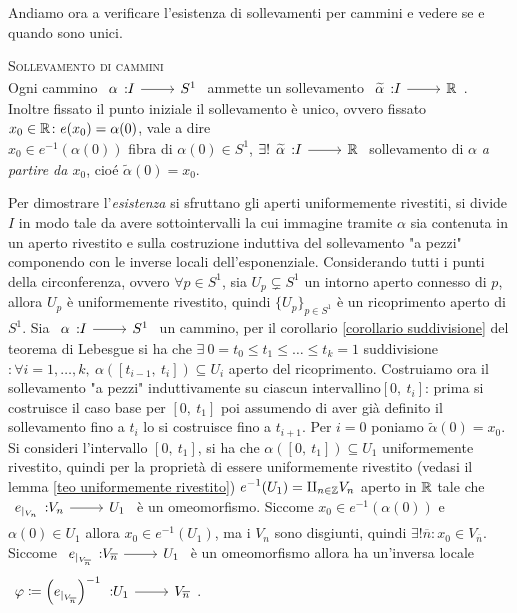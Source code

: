 Andiamo ora a verificare l'esistenza di sollevamenti per cammini e vedere se e quando sono unici.
\begin{theorema} \textsc{Sollevamento di cammini} \label{teo sollevamento cammini}\\
	Ogni cammino $\funz \alpha I {S^1}$ ammette un sollevamento $\funz {\widetilde{\alpha}} I \realset$. Inoltre fissato il punto iniziale il sollevamento è unico, ovvero fissato $x_0\in\mathbb{R} \colon e(x_0)=\alpha(0)$, vale a dire \\
	$x_0\in e^{-1}(\alpha(0))$ fibra di $\alpha(0)\in S^1$,  $\exists ! \funz {\widetilde{\alpha}} I \realset$ sollevamento di $\alpha$ \textit{a partire da $x_0$}, cioé $\widetilde{\alpha}(0)=x_0$.
\end{theorema}
\begin{demonstration}
	Per dimostrare l'\textit{esistenza} si sfruttano gli aperti uniformemente rivestiti, si divide $I$ in modo tale da avere sottointervalli la cui immagine tramite $\alpha$ sia contenuta in un aperto rivestito e sulla costruzione induttiva del sollevamento "a pezzi" componendo con le inverse locali dell'esponenziale.\newline
	Considerando tutti i punti della circonferenza, ovvero $\forall p\in S^1$, sia $U_p\subsetneq S^1$ un intorno aperto connesso di $p$, allora $U_p$ è uniformemente rivestito, quindi $\{U_p\}_{p\in S^1}$ è un ricoprimento aperto di $S^1$.\newline
	Sia $\funz \alpha I {S^1}$ un cammino, per il corollario \ref{corollario suddivisione} del teorema di Lebesgue si ha che $\exists\ 0=t_0\leq t_1\leq\dots\leq t_k=1$ suddivisione $\colon \forall i=1,\dots, k,\ \alpha([t_{i-1},\ t_i])\subseteq U_i$ aperto del ricoprimento. Costruiamo ora il sollevamento "a pezzi" induttivamente su ciascun intervallino$[0,\ t_i]$: prima si costruisce il caso base per $[0,\ t_1]$ poi assumendo di aver già definito il sollevamento fino a $t_i$ lo si costruisce fino a $t_{i+1}$.\newline 
	Per $i=0$ poniamo $\widetilde{\alpha}(0)=x_0$. Si consideri l'intervallo $[0,\ t_1]$, si ha che $\alpha\left([0,\ t_1]\right)\subseteq U_1$ uniformemente rivestito, quindi per la proprietà di essere uniformemente rivestito (vedasi il lemma \ref{teo uniformemente rivestito}) $\displaystyle e^{-1}(U_1) = \amalg_{n\in\mathbb{Z}}V_n$ aperto in $\mathbb{R}$ tale che $\funz {e_{|_{V_n}}} {V_n} {U_1}$ è un omeomorfismo. Siccome $x_0\in e^{-1}(\alpha(0))$ e $\alpha(0)\in U_1$ allora $x_0\in e^{-1}(U_1)$, ma i $V_n$ sono disgiunti, quindi $\exists ! \overline{n} \colon x_0\in V_{\overline{n}}$. Siccome $\funz {e_{|_{V_{\overline{n}}}}} {V_{\overline{n}}} {U_1}$ è un omeomorfismo allora ha un'inversa locale $\funz {\phi\coloneqq \left(e_{|_{V_{\overline{n}}}}\right)^{-1}} {U_1} {V_{\overline{n}}}$.\newline

\end{demonstration}
